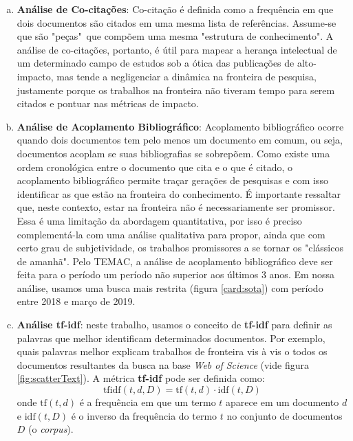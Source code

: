 \documentclass[sigconf]{acmart}
\begin{document}
\begin{enumerate}[a)]
  \item{\textbf{Análise de Co-citações}: Co-citação é definida como a frequência em que dois documentos são citados em uma mesma lista de referências. Assume-se que são "peças"~que compõem uma mesma "estrutura de conhecimento".  A análise de co-citações, portanto, é útil para mapear a herança intelectual de um determinado campo de estudos sob a ótica das publicações de alto-impacto, mas tende a negligenciar a dinâmica na fronteira de pesquisa\cite{Vogel2012}, justamente porque os trabalhos na fronteira não tiveram tempo para serem citados e pontuar nas métricas de impacto. }
    
    
  \item{\textbf{Análise de Acoplamento Bibliográfico}: Acoplamento bibliográfico ocorre quando dois documentos tem pelo menos um documento em comum, ou seja, documentos acoplam se suas bibliografias se sobrepõem. Como existe uma ordem cronológica entre o documento que cita e o que é citado, o acoplamento bibliográfico permite traçar gerações de pesquisas e com isso identificar as que estão na fronteira do conhecimento.  É importante ressaltar que, neste contexto, estar na fronteira não é necessariamente ser promissor. Essa é uma limitação da abordagem quantitativa, por isso é preciso complementá-la com uma análise qualitativa para propor, ainda que com certo grau de subjetividade, os trabalhos promissores a se tornar os "clássicos de amanhã".
  Pelo TEMAC, a análise de acoplamento bibliográfico deve ser feita para o período um período não superior aos últimos 3 anos. Em nossa análise, usamos uma busca mais restrita (figura \ref{card:sota}) com período entre 2018 e março de 2019.
  }
  \item{\textbf{Análise tf-idf}: neste trabalho, usamos o conceito de \textbf{tf-idf} para definir as palavras que melhor identificam determinados documentos. Por exemplo, quais palavras melhor explicam trabalhos de fronteira vis à vis o todos os documentos resultantes da busca na base \emph{Web of Science} (vide figura \ref{fig:scatterText}). A métrica \textbf{tf-idf} pode ser definida como:
  \begin{equation}
    \mathrm{tfidf}(t,d,D) = \mathrm{tf}(t,d) \cdot \mathrm{idf}(t, D)
  \end{equation}
  onde $\mathrm{tf}(t,d)$ é a frequência em que um termo $t$ aparece em um documento $d$ e $\mathrm{idf}(t, D)$ é o inverso da frequência do termo $t$ no conjunto de documentos $D$ (o \emph{corpus}). 
  \begin{equation}

\end{equation}}
\end{enumerate}
\end{document}
